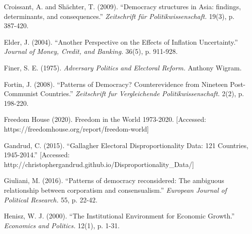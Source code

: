 \documentclass[11pt, oneside]{article}   	%
\begin{document}
\begin{flushleft}

Croissant, A. and Shächter, T. (2009). “Democracy structures in Asia: findings, determinants, and consequences.” \textit{Zeitschrift für Politikwissenschaft.} 19(3), p. 387-420.
\end{flushleft}

\begin{flushleft}

Elder, J. (2004). “Another Perspective on the Effects of Inflation Uncertainty.” \textit{Journal of Money, Credit, and Banking.} 36(5), p. 911-928.
\end{flushleft}

\begin{flushleft}

Finer, S. E. (1975). \textit{Adversary Politics and Electoral Reform.} Anthony Wigram.
\end{flushleft}

\begin{flushleft}

Fortin, J. (2008). “Patterns of Democracy? Counterevidence from Nineteen Post-Communist Countries.” \textit{Zeitschrift fur Vergleichende Politikwissenschaft.} 2(2), p. 198-220.
\end{flushleft}

\begin{flushleft}

Freedom House (2020). Freedom in the World 1973-2020. [Accessed: https://freedomhouse.org/report/freedom-world]
\end{flushleft}

\begin{flushleft}

Gandrud, C. (2015). “Gallagher Electoral Disproportionality Data: 121 Countries, 1945-2014.” [Accessed: http://christophergandrud.github.io/Disproportionality\_Data/]
\end{flushleft}

\begin{flushleft}

Giuliani, M. (2016). “Patterns of democracy reconsidered: The ambiguous relationship between corporatism and consensualism.” \textit{European Journal of Political Research.} 55, p. 22-42.
\end{flushleft}

\begin{flushleft}

Henisz, W. J. (2000). “The Institutional Environment for Economic Growth.” \textit{Economics and Politics.} 12(1), p. 1-31.
\end{flushleft}
\end{document}
